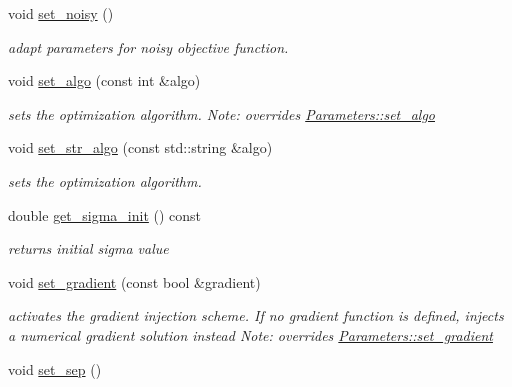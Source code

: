 \begin{DoxyCompactItemize}
\item 
\hypertarget{classlibcmaes_1_1CMAParameters_aa6dc1bafcff83e082db9146a923949d3}{void \hyperlink{classlibcmaes_1_1CMAParameters_aa6dc1bafcff83e082db9146a923949d3}{set\+\_\+noisy} ()}\label{classlibcmaes_1_1CMAParameters_aa6dc1bafcff83e082db9146a923949d3}

\begin{DoxyCompactList}\small\item\em adapt parameters for noisy objective function. \end{DoxyCompactList}\item 
void \hyperlink{classlibcmaes_1_1CMAParameters_ae309593a6644b46d93fff2ec04b0e36d}{set\+\_\+algo} (const int \&algo)
\begin{DoxyCompactList}\small\item\em sets the optimization algorithm. Note\+: overrides \hyperlink{classlibcmaes_1_1Parameters_aeb869d18fa0c987f56216d9bfa1f1a0d}{Parameters\+::set\+\_\+algo} \end{DoxyCompactList}\item 
void \hyperlink{classlibcmaes_1_1CMAParameters_aa4cfa45b55bbebb90b316af6d613900c}{set\+\_\+str\+\_\+algo} (const std\+::string \&algo)
\begin{DoxyCompactList}\small\item\em sets the optimization algorithm. \end{DoxyCompactList}\item 
double \hyperlink{classlibcmaes_1_1CMAParameters_acf3ce19952497b308627d1ef704e531a}{get\+\_\+sigma\+\_\+init} () const 
\begin{DoxyCompactList}\small\item\em returns initial sigma value \end{DoxyCompactList}\item 
void \hyperlink{classlibcmaes_1_1CMAParameters_aad2383969e667808f71af8749a118cc1}{set\+\_\+gradient} (const bool \&gradient)
\begin{DoxyCompactList}\small\item\em activates the gradient injection scheme. If no gradient function is defined, injects a numerical gradient solution instead Note\+: overrides \hyperlink{classlibcmaes_1_1Parameters_a38082ad1568c356caff5b299d6faea11}{Parameters\+::set\+\_\+gradient} \end{DoxyCompactList}\item 
\hypertarget{classlibcmaes_1_1CMAParameters_a1f2115c14728278a946c358d8d26f30c}{void \hyperlink{classlibcmaes_1_1CMAParameters_a1f2115c14728278a946c358d8d26f30c}{set\+\_\+sep} ()}\label{classlibcmaes_1_1CMAParameters_a1f2115c14728278a946c358d8d26f30c}


\end{DoxyCompactItemize}

